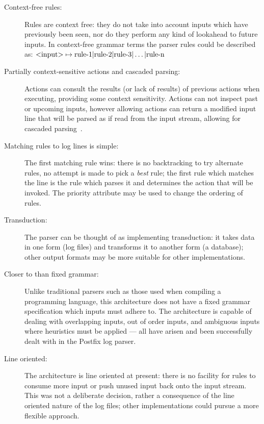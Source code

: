 \documentclass[draft]{svmult}
\begin{document}
\begin{description}

    \item [Context-free rules:]  Rules are context free: they do not take
        into account inputs which have previously been seen, nor do they
        perform any kind of lookahead to future inputs.  In context-free
        grammar terms the parser rules could be described as:
        $\text{\textless{}input\textgreater{}} \mapsto \text{rule-1} |
        \text{rule-2} | \text{rule-3} | \dots | \text{rule-n}$

    \item [Partially context-sensitive actions and cascaded parsing:]
        Actions can consult the results (or lack of results) of previous
        actions when executing, providing some context sensitivity.
        Actions can not inspect past or upcoming inputs, however allowing
        actions can return a modified input line that will be parsed as if
        read from the input stream, allowing for cascaded
        parsing~\cite{cascaded-parsing}.

    \item [Matching rules to log lines is simple:]  The first matching rule
        wins: there is no backtracking to try alternate rules, no attempt
        is made to pick a \textit{best\/} rule; the first rule which
        matches the line is the rule which parses it and determines the
        action that will be invoked.  The priority attribute may be used to
        change the ordering of rules.

    \item [Transduction:]  The parser can be thought of as implementing
        transduction: it takes data in one form (log files) and transforms
        it to another form (a database); other output formats may be more
        suitable for other implementations.

    \item [Closer to \NLP{} than fixed grammar:]  Unlike traditional
        parsers such as those used when compiling a programming language,
        this architecture does not have a fixed grammar specification which
        inputs must adhere to.  The architecture is capable of dealing with
        overlapping inputs, out of order inputs, and ambiguous inputs where
        heuristics must be applied --- all have arisen and been
        successfully dealt with in the Postfix log parser.

    \item [Line oriented:]  The architecture is line oriented at present:
        there is no facility for rules to consume more input or push unused
        input back onto the input stream.  This was not a deliberate
        decision, rather a consequence of the line oriented nature of the
        log files; other implementations could pursue a more flexible
        approach.

\end{description}
\end{document}
